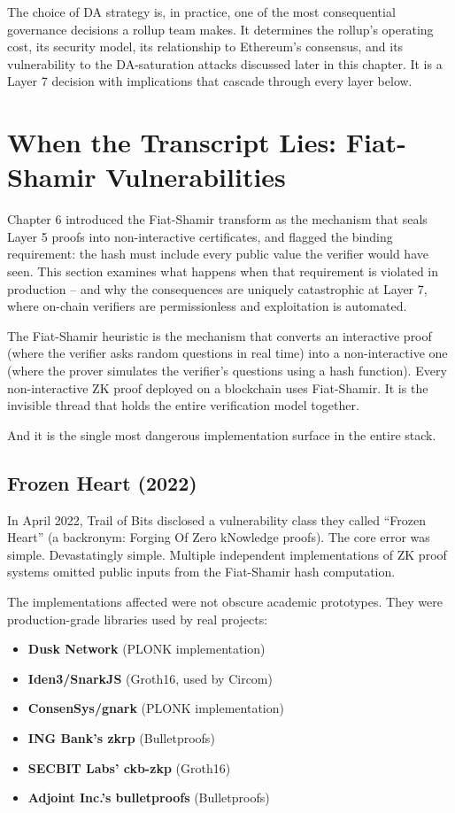 \documentclass[
  11pt,
  openany]{report}
\providecommand{\tightlist}{%
  \setlength{\itemsep}{0pt}\setlength{\parskip}{0pt}}
\renewcommand{\textbf}[1]{{\bfseries\color{MidnightBold}#1}}
\begin{document}
The choice of DA strategy is, in practice, one of the most consequential
governance decisions a rollup team makes. It determines the rollup's operating
cost, its security model, its relationship to Ethereum's consensus, and its
vulnerability to the DA-saturation attacks discussed later in this chapter. It
is a Layer 7 decision with implications that cascade through every layer below.

\section{When the Transcript Lies: Fiat-Shamir
Vulnerabilities}\label{when-the-transcript-lies-fiat-shamir-vulnerabilities}

Chapter 6 introduced the Fiat-Shamir transform as the mechanism that seals Layer
5 proofs into non-interactive certificates, and flagged the binding requirement:
the hash must include every public value the verifier would have seen. This
section examines what happens when that requirement is violated in production --
and why the consequences are uniquely catastrophic at Layer 7, where on-chain
verifiers are permissionless and exploitation is automated.

The Fiat-Shamir heuristic is the mechanism that converts an interactive proof
(where the verifier asks random questions in real time) into a non-interactive
one (where the prover simulates the verifier's questions using a hash function).
Every non-interactive ZK proof deployed on a blockchain uses Fiat-Shamir. It is
the invisible thread that holds the entire verification model together.

And it is the single most dangerous implementation surface in the entire stack.

\subsection{Frozen Heart (2022)}\label{frozen-heart-2022}

In April 2022, Trail of Bits disclosed a vulnerability class they called
``Frozen Heart'' (a backronym: Forging Of Zero kNowledge proofs). The core error
was simple. Devastatingly simple. Multiple independent implementations of ZK
proof systems omitted public inputs from the Fiat-Shamir hash computation.

The implementations affected were not obscure academic prototypes. They were
production-grade libraries used by real projects:

\begin{itemize}
\tightlist
\item
  \textbf{Dusk Network} (PLONK implementation)
\item
  \textbf{Iden3/SnarkJS} (Groth16, used by Circom)
\item
  \textbf{ConsenSys/gnark} (PLONK implementation)
\item
  \textbf{ING Bank's zkrp} (Bulletproofs)
\item
  \textbf{SECBIT Labs' ckb-zkp} (Groth16)
\item
  \textbf{Adjoint Inc.'s bulletproofs} (Bulletproofs)
\end{itemize}
\end{document}
